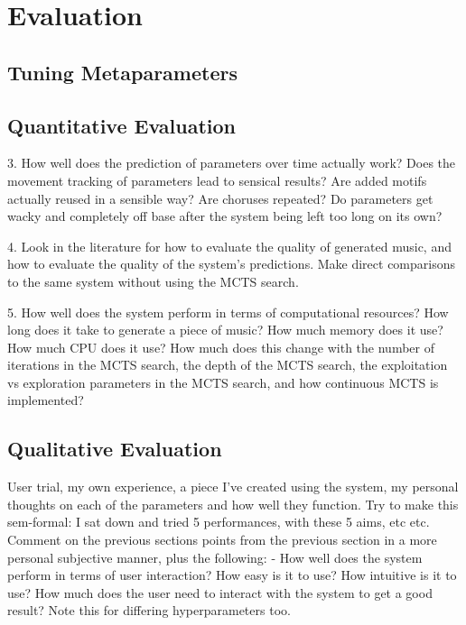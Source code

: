 \chapter{Evaluation}\label{chap:evaluation}

\section{Tuning Metaparameters}


\section{Quantitative Evaluation}
3. How well does the prediction of parameters over time actually work? Does the movement tracking of parameters lead to sensical results? Are added motifs actually reused in a sensible way? Are choruses repeated? Do parameters get wacky and completely off base after the system being left too long on its own?

4. Look in the literature for how to evaluate the quality of generated music, and how to evaluate the quality of the system's predictions. Make direct comparisons to the same system without using the MCTS search.

5. How well does the system perform in terms of computational resources? How long does it take to generate a piece of music? How much memory does it use? How much CPU does it use? How much does this change with the number of iterations in the MCTS search, the depth of the MCTS search, the exploitation vs exploration parameters in the MCTS search, and how continuous MCTS is implemented?

\section{Qualitative Evaluation}
User trial, my own experience, a piece I've created using the system, my personal thoughts on each of the parameters and how well they function. Try to make this sem-formal: I sat down and tried 5 performances, with these 5 aims, etc etc.
Comment on the previous sections points from the previous section in a more personal subjective manner, plus the following:
- How well does the system perform in terms of user interaction? How easy is it to use? How intuitive is it to use? How much does the user need to interact with the system to get a good result? Note this for differing hyperparameters too.



